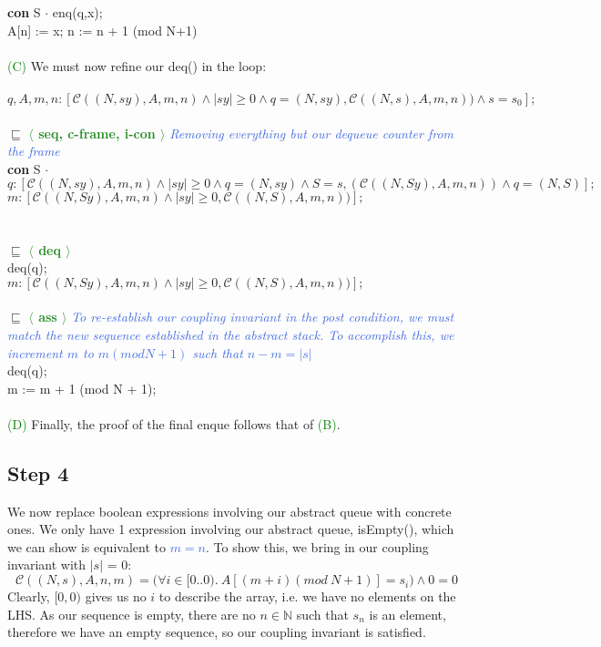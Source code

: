 \documentclass[a4paper]{scrartcl}
\newcommand{\N}{\mathbb{N}}
\newcommand{\C}{\mathcal{C}}
\newcommand{\refinedby}{\sqsubseteq} %
\newcommand{\rc}[1]{ $\refinedby$ \quad \textbf{\textcolor{ForestGreen}{$\langle$ #1 $\rangle$}}}
\newcommand{\explain}[1]{\textcolor{RoyalBlue}{\textit{#1}}}
\newcommand{\ab}[1]{\textcolor{WildStrawberry}{#1}}
\newcommand{\con}[1]{\textcolor{RoyalBlue}{#1}}
\begin{document}
{\textbf{con } S $\cdot$ enq(q,x);\\
A[n] := x; n := n + 1 (mod N+1) \\ \\
%
%
\textcolor{green}{(C)}
We must now refine our deq() in the loop: \\ \\
%
$ q, A, m, n : [\C((N,sy),A,m,n) \land |sy| \geq 0 \land q = (N,sy), \C((N,s),A,m,n)) \land s= s_0 ];$ \\  \\
%
\rc{seq, c-frame, i-con} \explain{Removing everything but our dequeue counter from the frame}\\
\textbf{con} S $\cdot$
$ q : [\C((N,sy),A,m,n) \land |sy| \geq 0 \land q = (N, sy) \land S = s, (\C((N,Sy),A,m,n)) \land q = (N,S) ];$ \\
$ m : [\C((N,Sy),A,m,n) \land |sy| \geq 0, \C((N,S),A,m,n)) ];$ \\ \\ \\
%
\rc{deq} \\
deq(q); \\
$ m : [\C((N,Sy),A,m,n) \land |sy| \geq 0, \C((N,S),A,m,n)) ];$ \\ \\
%
\rc{ass} \explain{To re-establish our coupling invariant in the post condition, we must match the new sequence established in the abstract stack. To accomplish this, we increment $m$ to $m (mod N+1)$ such that $n-m = |s|$} \\
deq(q); \\
m := m + 1 (mod N + 1); \\ \\
%
\textcolor{green}{(D)} Finally, the proof of the final enque follows that of \textcolor{green}{(B)}.
%
\subsection{Step 4}
We now replace boolean expressions involving our abstract queue with concrete ones. We only have 1 expression involving our abstract queue, \ab{isEmpty()}, which we can show is equivalent to \con{$m = n$}. To show this, we bring in our coupling invariant with $|s|$ = 0:
\[ \C((N, s), A, n, m) = \Big( \forall i \in [0..0). ~A[(m + i)(mod ~N + 1)] = s_i\Big) \land 0 = 0 \]
%
Clearly, $[0,0)$ gives us no $i$ to describe the array, i.e. we have no elements on the LHS. As our sequence is empty, there are no $n \in \N$ such that $s_n$ is an element, therefore we have an empty sequence, so our coupling invariant is satisfied.\\

}
\end{document}
